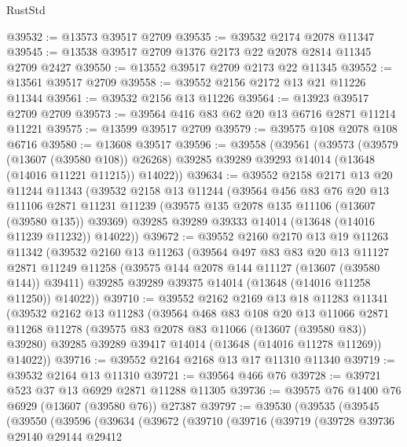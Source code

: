 \begin{lexlean}{RustStd}
\begin{coremodule}
@39532 := @13573 @39517 @2709
@39535 := @39532 @2174 @2078 @11347
@39545 := @13538 @39517 @2709 @1376 @2173 @22 @2078 @2814 @11345 @2709 @2427
@39550 := @13552 @39517 @2709 @2173 @22 @11345
@39552 := @13561 @39517 @2709
@39558 := @39552 @2156 @2172 @13 @21 @11226 @11344
@39561 := @39532 @2156 @13 @11226
@39564 := @13923 @39517 @2709 @2709
@39573 := @39564 @416 @83 @62 @20 @13 @6716 @2871 @11214 @11221
@39575 := @13599 @39517 @2709
@39579 := @39575 @108 @2078 @108 @6716
@39580 := @13608 @39517
@39596 := @39558
    (@39561
      (@39573
        (@39579 (@13607 (@39580 @108)) @26268)
        @39285
        @39289
        @39293
        @14014
        (@13648 (@14016 @11221 @11215))
        @14022))
@39634 := @39552
    @2158
    @2171
    @13
    @20
    @11244
    @11343
    (@39532
      @2158
      @13
      @11244
      (@39564
        @456
        @83
        @76
        @20
        @13
        @11106
        @2871
        @11231
        @11239
        (@39575 @135 @2078 @135 @11106 (@13607 (@39580 @135)) @39369)
        @39285
        @39289
        @39333
        @14014
        (@13648 (@14016 @11239 @11232))
        @14022))
@39672 := @39552
    @2160
    @2170
    @13
    @19
    @11263
    @11342
    (@39532
      @2160
      @13
      @11263
      (@39564
        @497
        @83
        @83
        @20
        @13
        @11127
        @2871
        @11249
        @11258
        (@39575 @144 @2078 @144 @11127 (@13607 (@39580 @144)) @39411)
        @39285
        @39289
        @39375
        @14014
        (@13648 (@14016 @11258 @11250))
        @14022))
@39710 := @39552
    @2162
    @2169
    @13
    @18
    @11283
    @11341
    (@39532
      @2162
      @13
      @11283
      (@39564
        @468
        @83
        @108
        @20
        @13
        @11066
        @2871
        @11268
        @11278
        (@39575 @83 @2078 @83 @11066 (@13607 (@39580 @83)) @39280)
        @39285
        @39289
        @39417
        @14014
        (@13648 (@14016 @11278 @11269))
        @14022))
@39716 := @39552 @2164 @2168 @13 @17 @11310 @11340
@39719 := @39532 @2164 @13 @11310
@39721 := @39564 @466 @76
@39728 := @39721 @523 @37 @13 @6929 @2871 @11288 @11305
@39736 := @39575 @76 @1400 @76 @6929 (@13607 (@39580 @76)) @27387
@39797 := @39530
    (@39535
      (@39545
        (@39550
          (@39596
            (@39634
              (@39672
                (@39710
                  (@39716
                    (@39719
                      (@39728
                        @39736
                        @29140
                        @29144
                        @29412

\end{coremodule}
\end{lexlean}
